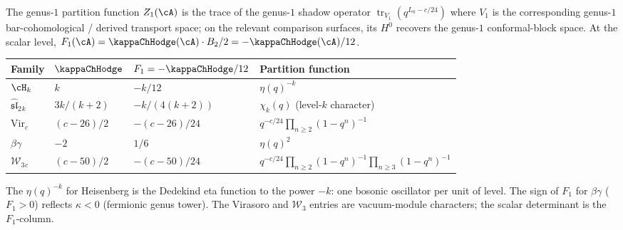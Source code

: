 \begin{computation}
The genus-$1$ partition function $Z_1(\cA)$
is the trace of the genus-$1$ shadow operator
$\operatorname{tr}_{V_1}(q^{L_0-c/24})$ where
$V_1$ is the corresponding genus-$1$ bar-cohomological /
derived transport space; on the relevant comparison surfaces,
its $H^0$ recovers the genus-$1$ conformal-block space.
At the scalar level,
$F_1(\cA)=\kappaChHodge(\cA)\cdot B_2/2
=-\kappaChHodge(\cA)/12$.
\begin{center}
\renewcommand{\arraystretch}{1.2}
\begin{tabular}{llll}
\textbf{Family} & $\kappaChHodge$ & $F_1=-\kappaChHodge/12$
 & \textbf{Partition function} \\
\hline
$\cH_k$ & $k$ & $-k/12$
 & $\eta(q)^{-k}$ \\
$\widehat{\mathfrak{sl}}_2{}_k$
 & $3k/(k{+}2)$ & $-k/(4(k{+}2))$
 & $\chi_k(q)$ (level-$k$ character) \\
$\mathrm{Vir}_c$ & $(c{-}26)/2$ & $-(c{-}26)/24$
 & $q^{-c/24}\prod_{n\geq 2}(1-q^n)^{-1}$ \\
$\beta\gamma$ & $-2$ & $1/6$
 & $\eta(q)^2$ \\
$\mathcal W_3{}_c$ & $(c{-}50)/2$ & $-(c{-}50)/24$
 & $q^{-c/24}\prod_{n\geq2}(1-q^n)^{-1}
    \prod_{n\geq3}(1-q^n)^{-1}$
\end{tabular}
\end{center}
The $\eta(q)^{-k}$ for Heisenberg is the Dedekind eta
function to the power $-k$: one bosonic oscillator per unit
of level. The sign of $F_1$ for $\beta\gamma$ ($F_1>0$)
reflects $\kappa<0$ (fermionic genus tower).
The Virasoro and \(\mathcal W_3\) entries are vacuum-module
characters; the scalar determinant is the \(F_1\)-column.
\end{computation}

